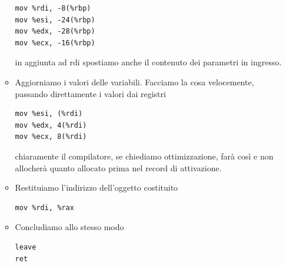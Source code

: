 \documentclass[11pt]{report}
\theoremstyle{definition}
\begin{document}
\begin{itemize}
\begin{itemize}
\begin{verbatim}
mov %rdi, -8(%rbp)
mov %esi, -24(%rbp)
mov %edx, -28(%rbp)
mov %ecx, -16(%rbp)
\end{verbatim}
in aggiunta ad rdi spostiamo anche il contenuto dei parametri in ingresso. 
\item Aggiorniamo i valori delle variabili. Facciamo la cosa velocemente, passando direttamente i valori dai registri
\begin{verbatim}
mov %esi, (%rdi)
mov %edx, 4(%rdi)
mov %ecx, 8(%rdi)
\end{verbatim}
chiaramente il compilatore, se chiediamo ottimizzazione, farà così e non allocherà quanto allocato prima nel record di attivazione.
\item Restituiamo l'indirizzo dell'oggetto costituito
\begin{verbatim}
mov %rdi, %rax
\end{verbatim}
\item Concludiamo allo stesso modo
\begin{verbatim}
leave
ret
\end{verbatim}
\end{itemize}
\end{itemize}
\end{document}
